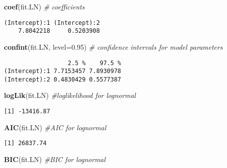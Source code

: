 \documentclass[]{book}
\newenvironment{Shaded}{\begin{snugshade}}{\end{snugshade}}
\newcommand{\KeywordTok}[1]{\textcolor[rgb]{0.13,0.29,0.53}{\textbf{#1}}}
\newcommand{\DataTypeTok}[1]{\textcolor[rgb]{0.13,0.29,0.53}{#1}}
\newcommand{\FloatTok}[1]{\textcolor[rgb]{0.00,0.00,0.81}{#1}}
\newcommand{\CommentTok}[1]{\textcolor[rgb]{0.56,0.35,0.01}{\textit{#1}}}
\newcommand{\NormalTok}[1]{#1}
\theoremstyle{definition}
\theoremstyle{definition}
\theoremstyle{definition}
\theoremstyle{remark}
\begin{document}
\begin{Shaded}
\begin{Highlighting}[]
\KeywordTok{coef}\NormalTok{(fit.LN)                 }\CommentTok{# coefficients}
\end{Highlighting}
\end{Shaded}

\begin{verbatim}
(Intercept):1 (Intercept):2 
    7.8042218     0.5203908 
\end{verbatim}

\begin{Shaded}
\begin{Highlighting}[]
\KeywordTok{confint}\NormalTok{(fit.LN, }\DataTypeTok{level=}\FloatTok{0.95}\NormalTok{)  }\CommentTok{# confidence intervals for model parameters }
\end{Highlighting}
\end{Shaded}

\begin{verbatim}
                  2.5 %    97.5 %
(Intercept):1 7.7153457 7.8930978
(Intercept):2 0.4830429 0.5577387
\end{verbatim}

\begin{Shaded}
\begin{Highlighting}[]
\KeywordTok{logLik}\NormalTok{(fit.LN)               }\CommentTok{#loglikelihood for lognormal}
\end{Highlighting}
\end{Shaded}

\begin{verbatim}
[1] -13416.87
\end{verbatim}

\begin{Shaded}
\begin{Highlighting}[]
\KeywordTok{AIC}\NormalTok{(fit.LN)                  }\CommentTok{#AIC for lognormal}
\end{Highlighting}
\end{Shaded}

\begin{verbatim}
[1] 26837.74
\end{verbatim}

\begin{Shaded}
\begin{Highlighting}[]
\KeywordTok{BIC}\NormalTok{(fit.LN)                  }\CommentTok{#BIC for lognormal}
\end{Highlighting}
\end{Shaded}
\end{document}
